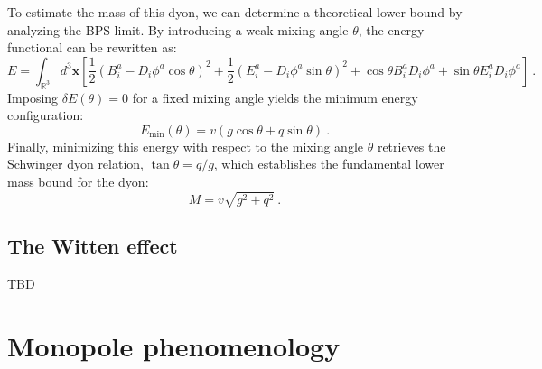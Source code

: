 \documentclass[a4paper,11pt]{article}
\begin{document}
To estimate the mass of this dyon, we can determine a theoretical lower bound by analyzing the BPS limit. By introducing a weak mixing angle $\theta$, the energy functional can be rewritten as:
\begin{equation}
    E=\int_{\mathbb R^3}d^3 \boldsymbol x\left[\frac{1}{2}(B_i^a-D_i\phi^a\cos\theta)^2+\frac{1}{2}(E_i^a-D_i\phi^a\sin\theta)^2+\cos\theta B_i^a D_i\phi^a+\sin\theta E_i^aD_i\phi^a \right]\ .
\end{equation}
Imposing $\delta E(\theta) = 0$ for a fixed mixing angle yields the minimum energy configuration:
\begin{equation}
    E_{\text{min}}(\theta)=v(g\cos\theta+q\sin\theta)\ .
\end{equation}
Finally, minimizing this energy with respect to the mixing angle $\theta$ retrieves the Schwinger dyon relation, $\tan\theta = q/g$, which establishes the fundamental lower mass bound for the dyon:
\begin{equation}
    M=v\sqrt{g^2+q^2}\ .
\end{equation}
\subsection{The Witten effect}

TBD

\section{Monopole phenomenology}
\end{document}
